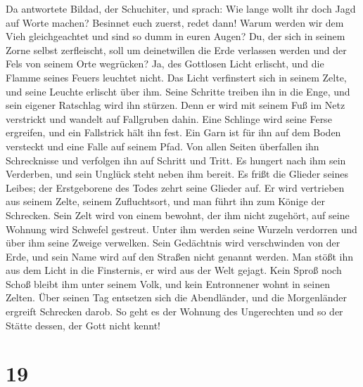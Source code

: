  Da antwortete Bildad, der Schuchiter, und sprach:
 Wie lange wollt ihr doch Jagd auf Worte machen? Besinnet
euch zuerst, redet dann!  Warum werden wir dem Vieh
gleichgeachtet und sind so dumm in euren Augen?  Du, der
sich in seinem Zorne selbst zerfleischt, soll um deinetwillen die Erde
verlassen werden und der Fels von seinem Orte wegrücken? 
Ja, des Gottlosen Licht erlischt, und die Flamme seines Feuers leuchtet
nicht.  Das Licht verfinstert sich in seinem Zelte, und
seine Leuchte erlischt über ihm.  Seine Schritte treiben
ihn in die Enge, und sein eigener Ratschlag wird ihn stürzen.
 Denn er wird mit seinem Fuß im Netz verstrickt und
wandelt auf Fallgruben dahin.  Eine Schlinge wird seine
Ferse ergreifen, und ein Fallstrick hält ihn fest.  Ein
Garn ist für ihn auf dem Boden versteckt und eine Falle auf seinem Pfad.
 Von allen Seiten überfallen ihn Schrecknisse und
verfolgen ihn auf Schritt und Tritt.  Es hungert nach ihm
sein Verderben, und sein Unglück steht neben ihm bereit. 
Es frißt die Glieder seines Leibes; der Erstgeborene des Todes zehrt
seine Glieder auf.  Er wird vertrieben aus seinem Zelte,
seinem Zufluchtsort, und man führt ihn zum Könige der Schrecken.
 Sein Zelt wird von einem bewohnt, der ihm nicht
zugehört, auf seine Wohnung wird Schwefel gestreut. 
Unter ihm werden seine Wurzeln verdorren und über ihm seine Zweige
verwelken.  Sein Gedächtnis wird verschwinden von der
Erde, und sein Name wird auf den Straßen nicht genannt werden.
 Man stößt ihn aus dem Licht in die Finsternis, er wird
aus der Welt gejagt.  Kein Sproß noch Schoß bleibt ihm
unter seinem Volk, und kein Entronnener wohnt in seinen Zelten.
 Über seinen Tag entsetzen sich die Abendländer, und die
Morgenländer ergreift Schrecken darob.  So geht es der
Wohnung des Ungerechten und so der Stätte dessen, der Gott nicht kennt!

\hypertarget{section-18}{%
\section{19}\label{section-18}}

